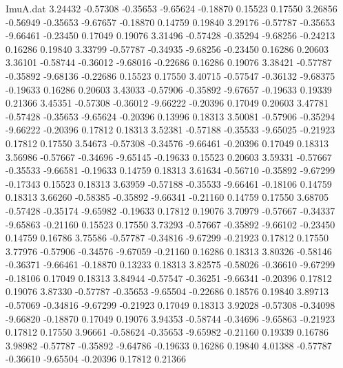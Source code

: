 \begin{filecontents}{ImuA.dat}
   3.24432   -0.57308   -0.35653   -9.65624   -0.18870    0.15523    0.17550
   3.26856   -0.56949   -0.35653   -9.67657   -0.18870    0.14759    0.19840
   3.29176   -0.57787   -0.35653   -9.66461   -0.23450    0.17049    0.19076
   3.31496   -0.57428   -0.35294   -9.68256   -0.24213    0.16286    0.19840
   3.33799   -0.57787   -0.34935   -9.68256   -0.23450    0.16286    0.20603
   3.36101   -0.58744   -0.36012   -9.68016   -0.22686    0.16286    0.19076
   3.38421   -0.57787   -0.35892   -9.68136   -0.22686    0.15523    0.17550
   3.40715   -0.57547   -0.36132   -9.68375   -0.19633    0.16286    0.20603
   3.43033   -0.57906   -0.35892   -9.67657   -0.19633    0.19339    0.21366
   3.45351   -0.57308   -0.36012   -9.66222   -0.20396    0.17049    0.20603
   3.47781   -0.57428   -0.35653   -9.65624   -0.20396    0.13996    0.18313
   3.50081   -0.57906   -0.35294   -9.66222   -0.20396    0.17812    0.18313
   3.52381   -0.57188   -0.35533   -9.65025   -0.21923    0.17812    0.17550
   3.54673   -0.57308   -0.34576   -9.66461   -0.20396    0.17049    0.18313
   3.56986   -0.57667   -0.34696   -9.65145   -0.19633    0.15523    0.20603
   3.59331   -0.57667   -0.35533   -9.66581   -0.19633    0.14759    0.18313
   3.61634   -0.56710   -0.35892   -9.67299   -0.17343    0.15523    0.18313
   3.63959   -0.57188   -0.35533   -9.66461   -0.18106    0.14759    0.18313
   3.66260   -0.58385   -0.35892   -9.66341   -0.21160    0.14759    0.17550
   3.68705   -0.57428   -0.35174   -9.65982   -0.19633    0.17812    0.19076
   3.70979   -0.57667   -0.34337   -9.65863   -0.21160    0.15523    0.17550
   3.73293   -0.57667   -0.35892   -9.66102   -0.23450    0.14759    0.16786
   3.75586   -0.57787   -0.34816   -9.67299   -0.21923    0.17812    0.17550
   3.77976   -0.57906   -0.34576   -9.67059   -0.21160    0.16286    0.18313
   3.80326   -0.58146   -0.36371   -9.66461   -0.18870    0.13233    0.18313
   3.82575   -0.58026   -0.36610   -9.67299   -0.18106    0.17049    0.18313
   3.84944   -0.57547   -0.36251   -9.66341   -0.20396    0.17812    0.19076
   3.87330   -0.57787   -0.35653   -9.65504   -0.22686    0.18576    0.19840
   3.89713   -0.57069   -0.34816   -9.67299   -0.21923    0.17049    0.18313
   3.92028   -0.57308   -0.34098   -9.66820   -0.18870    0.17049    0.19076
   3.94353   -0.58744   -0.34696   -9.65863   -0.21923    0.17812    0.17550
   3.96661   -0.58624   -0.35653   -9.65982   -0.21160    0.19339    0.16786
   3.98982   -0.57787   -0.35892   -9.64786   -0.19633    0.16286    0.19840
   4.01388   -0.57787   -0.36610   -9.65504   -0.20396    0.17812    0.21366

\end{filecontents}

